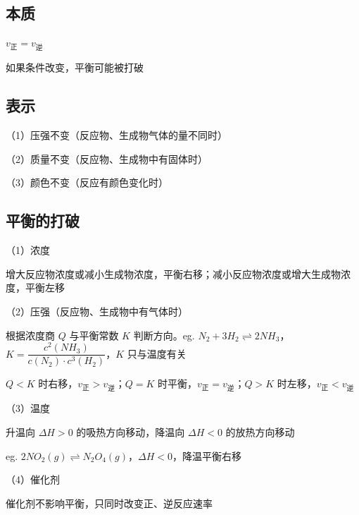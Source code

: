 \documentclass[UTF8,zihao=-4,openany]{ctexbook}
\begin{document}
\subsection{本质}
$v_{\scriptscriptstyle\mbox{正}}=v_{\scriptscriptstyle\mbox{逆}}$\par

如果条件改变，平衡可能被打破\par
\subsection{表示}
（1）压强不变（反应物、生成物气体的量不同时）\par

（2）质量不变（反应物、生成物中有固体时）\par

（3）颜色不变（反应有颜色变化时）\par
\subsection{平衡的打破}
（1）浓度\par

增大反应物浓度或减小生成物浓度，平衡右移；减小反应物浓度或增大生成物浓度，平衡左移\par

（2）压强（反应物、生成物中有气体时）\par

根据浓度商 $Q$ 与平衡常数 $K$ 判断方向。eg. $N_2+3H_2\rightleftharpoons2NH_3$，$K=\dfrac{c^2(NH_3)}{c(N_2)\cdot c^3(H_2)}$，$K$ 只与温度有关\par

$Q<K$ 时右移，$v_{\scriptscriptstyle\mbox{正}}>v_{\scriptscriptstyle\mbox{逆}}$；$Q=K$ 时平衡，$v_{\scriptscriptstyle\mbox{正}}=v_{\scriptscriptstyle\mbox{逆}}$；$Q>K$ 时左移，$v_{\scriptscriptstyle\mbox{正}}<v_{\scriptscriptstyle\mbox{逆}}$\par

（3）温度\par

升温向 $\Delta H>0$ 的吸热方向移动，降温向 $\Delta H<0$ 的放热方向移动\par

eg. $2NO_2(g)\rightleftharpoons N_2O_4(g)$，$\Delta H<0$，降温平衡右移\par

（4）催化剂\par

催化剂不影响平衡，只同时改变正、逆反应速率\par
\end{document}
